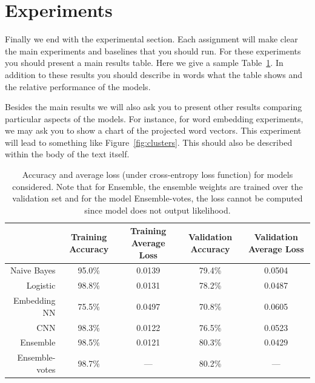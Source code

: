 \documentclass[11pt]{article}
\begin{document}
\section{Experiments}

Finally we end with the experimental section. Each assignment will make clear
the main experiments and baselines that you should run. For these experiments
you should present a main results table. Here we give a sample
Table~\ref{tab:results}. In addition to these results you should describe in
words what the table shows and the relative performance of the models.

Besides the main results we will also ask you to present other results
comparing particular aspects of the models. For instance, for word
embedding experiments, we may ask you to show a chart of the projected
word vectors. This experiment will lead to something like
Figure~\ref{fig:clusters}. This should also be described within the
body of the text itself.

\begin{landscape}
  \begin{table}[t]
\centering
\begin{tabular}{rcccc}
\toprule
{} & Training Accuracy &  Training Average Loss & Validation Accuracy &  Validation Average Loss \\
\midrule
Naive Bayes    &             95.0\% &                 0.0139 &               79.4\% &                   0.0504 \\
Logistic       &             98.8\% &                 0.0131 &               78.2\% &                   0.0487 \\
Embedding NN   &             75.5\% &                 0.0497 &               70.8\% &                   0.0605 \\
CNN            &             98.3\% &                 0.0122 &               76.5\% &                   0.0523 \\
Ensemble       &             98.5\% &                 0.0121 &               80.3\% &                   0.0429 \\
Ensemble-votes &             98.7\% &                    --- &               80.2\% &                      --- \\
\bottomrule
\end{tabular}
\caption{\label{tab:results} Accuracy and average loss (under cross-entropy loss
function) for models considered. Note that for Ensemble, the ensemble weights
are
trained over the validation set and for the model Ensemble-votes, the loss
cannot be computed since model does not output likelihood.}
\end{table}


\end{landscape}
\end{document}
